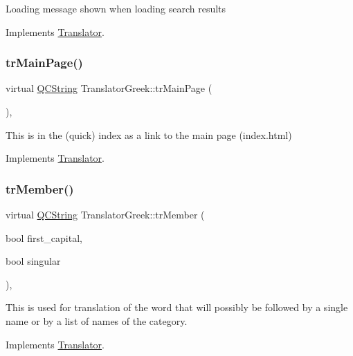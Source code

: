 Loading message shown when loading search results 

Implements \mbox{\hyperlink{class_translator}{Translator}}.

\mbox{\label{class_translator_greek_a1a8c7b3c8fb2f74bea7206a45b3dfaae}} 
\subsubsection{\texorpdfstring{trMainPage()}{trMainPage()}}
{\footnotesize\ttfamily virtual \mbox{\hyperlink{class_q_c_string}{Q\+C\+String}} Translator\+Greek\+::tr\+Main\+Page (\begin{DoxyParamCaption}{ }\end{DoxyParamCaption})\hspace{0.3cm}{\ttfamily [inline]}, {\ttfamily [virtual]}}

This is in the (quick) index as a link to the main page (index.\+html) 

Implements \mbox{\hyperlink{class_translator}{Translator}}.

\mbox{\label{class_translator_greek_a901c69bdd4917178151850bca6972525}} 
\subsubsection{\texorpdfstring{trMember()}{trMember()}}
{\footnotesize\ttfamily virtual \mbox{\hyperlink{class_q_c_string}{Q\+C\+String}} Translator\+Greek\+::tr\+Member (\begin{DoxyParamCaption}\item[{bool}]{first\+\_\+capital,  }\item[{bool}]{singular }\end{DoxyParamCaption})\hspace{0.3cm}{\ttfamily [inline]}, {\ttfamily [virtual]}}

This is used for translation of the word that will possibly be followed by a single name or by a list of names of the category. 

Implements \mbox{\hyperlink{class_translator}{Translator}}.

\mbox{\label{class_translator_greek_ab55e7b1781abf40f4244438c8b2c30bb}} 
